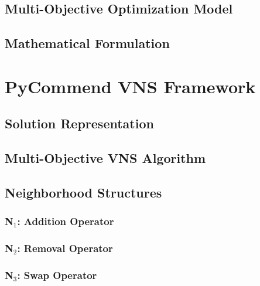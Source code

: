\documentclass[runningheads]{llncs}
\begin{document}
\subsection{Multi-Objective Optimization Model}


\subsection{Mathematical Formulation}


\section{PyCommend VNS Framework}

\subsection{Solution Representation}


\subsection{Multi-Objective VNS Algorithm}


\subsection{Neighborhood Structures}

\subsubsection{N$_1$: Addition Operator}


\subsubsection{N$_2$: Removal Operator}


\subsubsection{N$_3$: Swap Operator}
\end{document}

